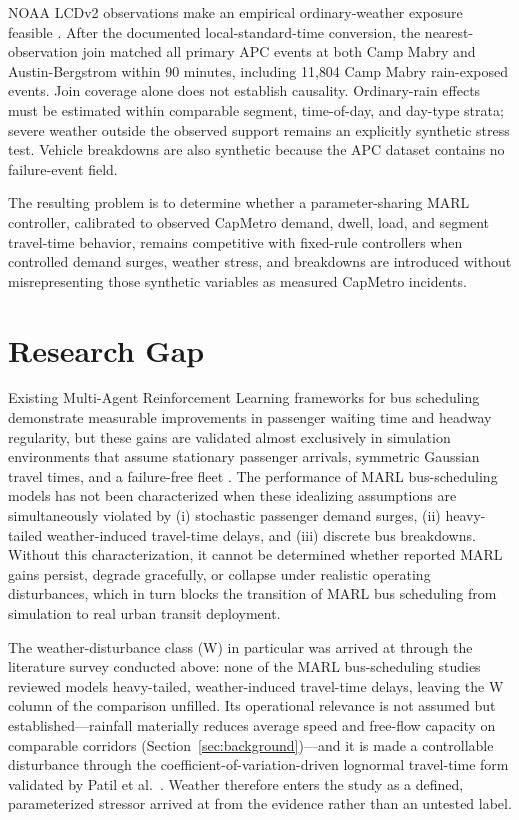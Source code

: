 NOAA LCDv2 observations make an empirical ordinary-weather exposure feasible \cite{NOAALCDv2}. After the documented local-standard-time conversion, the nearest-observation join matched all primary APC events at both Camp Mabry and Austin-Bergstrom within 90 minutes, including 11{,}804 Camp Mabry rain-exposed events. Join coverage alone does not establish causality. Ordinary-rain effects must be estimated within comparable segment, time-of-day, and day-type strata; severe weather outside the observed support remains an explicitly synthetic stress test. Vehicle breakdowns are also synthetic because the APC dataset contains no failure-event field.

The resulting problem is to determine whether a parameter-sharing MARL controller, calibrated to observed CapMetro demand, dwell, load, and segment travel-time behavior, remains competitive with fixed-rule controllers when controlled demand surges, weather stress, and breakdowns are introduced without misrepresenting those synthetic variables as measured CapMetro incidents.

\section{Research Gap}

Existing Multi-Agent Reinforcement Learning frameworks for bus scheduling demonstrate measurable improvements in passenger waiting time and headway regularity, but these gains are validated almost exclusively in simulation environments that assume stationary passenger arrivals, symmetric Gaussian travel times, and a failure-free fleet \cite{Wang2020Holding,Rodriguez2023Cooperative,Wangsun}. The performance of MARL bus-scheduling models has not been characterized when these idealizing assumptions are simultaneously violated by (i) stochastic passenger demand surges, (ii) heavy-tailed weather-induced travel-time delays, and (iii) discrete bus breakdowns. Without this characterization, it cannot be determined whether reported MARL gains persist, degrade gracefully, or collapse under realistic operating disturbances, which in turn blocks the transition of MARL bus scheduling from simulation to real urban transit deployment.

The weather-disturbance class (W) in particular was arrived at through the literature survey conducted above: none of the MARL bus-scheduling studies reviewed models heavy-tailed, weather-induced travel-time delays, leaving the W column of the comparison unfilled. Its operational relevance is not assumed but established---rainfall materially reduces average speed and free-flow capacity on comparable corridors (Section~\ref{sec:background})---and it is made a controllable disturbance through the coefficient-of-variation-driven lognormal travel-time form validated by Patil et al.~\cite{Patil2025Conformal}. Weather therefore enters the study as a defined, parameterized stressor arrived at from the evidence rather than an untested label.

